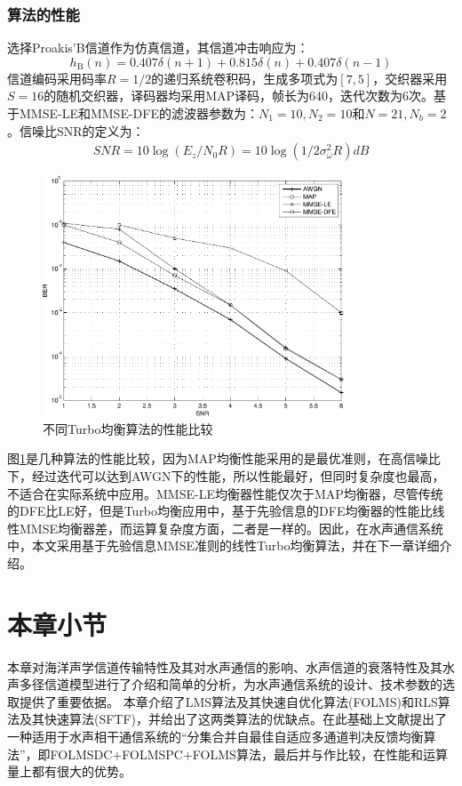 \subsubsection*{算法的性能}
选择Proakis'B信道作为仿真信道，其信道冲击响应为：
\begin{equation}
    h_{\mathrm{B}}(n)=0.407\delta(n+1)+0.815\delta(n)+0.407\delta(n-1)
    \label{equ:2.36}
\end{equation}
信道编码采用码率$R=1/2$的递归系统卷积码，生成多项式为$[7,5]$，交织器采用$S=16$的随机交织器，译码器均采用MAP译码，帧长为640，迭代次数为6次。基于MMSE-LE和MMSE-DFE的滤波器参数为：$N_1=10,N_2=10$和$N=21,N_b=2$。信噪比SNR的定义为：
\begin{eqnarray}
    SNR=10\log(E_z/N_0R)=10\log(1/2\sigma^2_\omega R)dB
    \label{equ:2.37}
\end{eqnarray}

\begin{figure}[htb]
  \begin{center}
    \includegraphics[width=0.8\textwidth]{images/diffcmp.pdf}
  \end{center}
  \caption{不同Turbo均衡算法的性能比较}
  \label{fig:2.5}
\end{figure}
图\ref{fig:2.5}是几种算法的性能比较，因为MAP均衡性能采用的是最优准则，在高信噪比下，经过迭代可以达到AWGN下的性能，所以性能最好，但同时复杂度也最高，不适合在实际系统中应用。MMSE-LE均衡器性能仅次于MAP均衡器，尽管传统的DFE比LE好，但是Turbo均衡应用中，基于先验信息的DFE均衡器的性能比线性MMSE均衡器差，而运算复杂度方面，二者是一样的。因此，在水声通信系统中，本文采用基于先验信息MMSE准则的线性Turbo均衡算法，并在下一章详细介绍。
\section{本章小节}
本章对海洋声学信道传输特性及其对水声通信的影响、水声信道的衰落特性及其水声多径信道模型进行了介绍和简单的分析，为水声通信系统的设计、技术参数的选取提供了重要依据。
本章介绍了LMS算法及其快速自优化算法(FOLMS)和RLS算法及其快速算法(SFTF)，并给出了这两类算法的优缺点。在此基础上文献提出了一种适用于水声相干通信系统的“分集合并自最佳自适应多通道判决反馈均衡算法”，即FOLMSDC+FOLMSPC+FOLMS算法，最后并与作比较，在性能和运算量上都有很大的优势。

